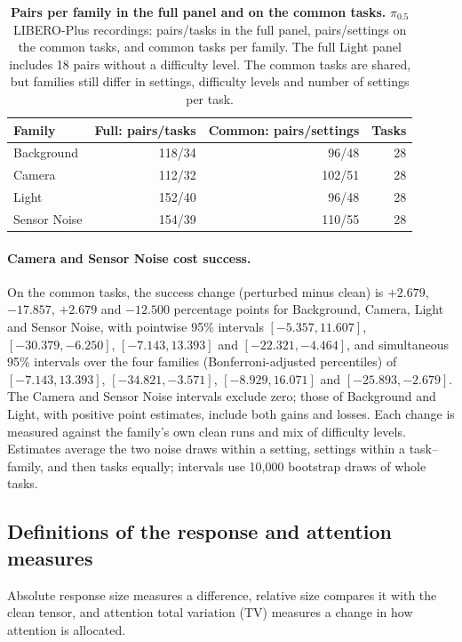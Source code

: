 \begin{table}[!ht]
\caption{\textbf{Pairs per family in the full panel and on the common tasks.} $\pi_{0.5}$ LIBERO-Plus recordings: pairs/tasks in the full panel, pairs/settings on the common tasks, and common tasks per family. The full Light panel includes 18 pairs without a difficulty level. The common tasks are shared, but families still differ in settings, difficulty levels and number of settings per task.}

\centering\small
\setlength{\tabcolsep}{2.5pt}
\begin{tabular}{lrrr}
\toprule
Family & Full: pairs/tasks & Common: pairs/settings & Tasks\\
\midrule
Background & 118/34 & 96/48 & 28\\
Camera & 112/32 & 102/51 & 28\\
Light & 152/40 & 96/48 & 28\\
Sensor Noise & 154/39 & 110/55 & 28\\
\bottomrule
\end{tabular}

\label{tab:plus-population}
\end{table}

\paragraph{Camera and Sensor Noise cost success.}
On the common tasks, the success change (perturbed minus clean) is $+2.679$, $-17.857$, $+2.679$ and $-12.500$ percentage points for Background, Camera, Light and Sensor Noise, with pointwise 95\% intervals $[-5.357,11.607]$, $[-30.379,-6.250]$, $[-7.143,13.393]$ and $[-22.321,-4.464]$, and simultaneous 95\% intervals over the four families (Bonferroni-adjusted percentiles) of $[-7.143,13.393]$, $[-34.821,-3.571]$, $[-8.929,16.071]$ and $[-25.893,-2.679]$. The Camera and Sensor Noise intervals exclude zero; those of Background and Light, with positive point estimates, include both gains and losses. Each change is measured against the family's own clean runs and mix of difficulty levels. Estimates average the two noise draws within a setting, settings within a task--family, and then tasks equally; intervals use 10,000 bootstrap draws of whole tasks.

\subsection{Definitions of the response and attention measures}
\label{sec:plus-sites}
Absolute response size measures a difference, relative size compares it with the clean tensor, and attention total variation (TV) measures a change in how attention is allocated.

